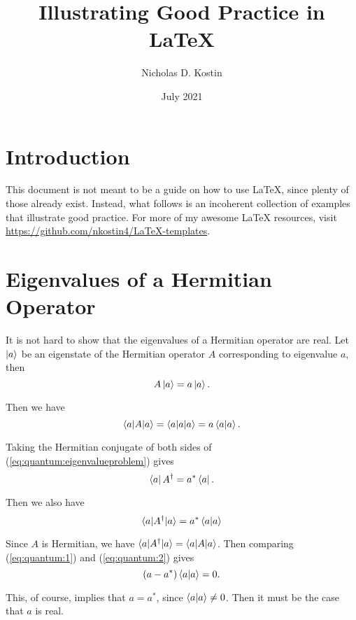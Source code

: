 \documentclass{article}
\title{Illustrating Good Practice in {\LaTeX}}
\author{Nicholas D. Kostin}
\date{July 2021}
\begin{document}
\maketitle

\section{Introduction}

This document is not meant to be a guide on how to use {\LaTeX}, since plenty of those already exist. Instead, what follows is an incoherent collection of examples that illustrate good practice. For more of my awesome {\LaTeX} resources, visit \url{https://github.com/nkostin4/LaTeX-templates}.

\section{Eigenvalues of a Hermitian Operator}

It is not hard to show that the eigenvalues of a Hermitian operator are real. Let $\ket{a}$ be an eigenstate of the Hermitian operator $A$ corresponding to eigenvalue $a$, then
\begin{equation}
    A \ket{a} = a \ket{a}. \label{eq:quantum:eigenvalueproblem}
\end{equation}

Then we have
\begin{equation}
    \braket{a|A|a} = \braket{a|a|a} = a\braket{a|a}. \label{eq:quantum:1}
\end{equation}

Taking the Hermitian conjugate of both sides of (\ref{eq:quantum:eigenvalueproblem}) gives
\begin{equation}
    \bra{a} A^{\dagger} = a^{*} \bra{a}.
\end{equation}

Then we also have
\begin{equation}
    \braket{a|A^{\dagger}|a} = a^{*} \braket{a|a} \label{eq:quantum:2}
\end{equation}

Since $A$ is Hermitian, we have $\braket{a|A^{\dagger}|a} = \braket{a|A|a}$. Then comparing (\ref{eq:quantum:1}) and (\ref{eq:quantum:2}) gives
\begin{equation*}
    \left( a - a^* \right) \braket{a|a} = 0.
\end{equation*}

This, of course, implies that $a = a^*$, since $\braket{a|a} \neq 0$. Then it must be the case that $a$ is real.
\end{document}

